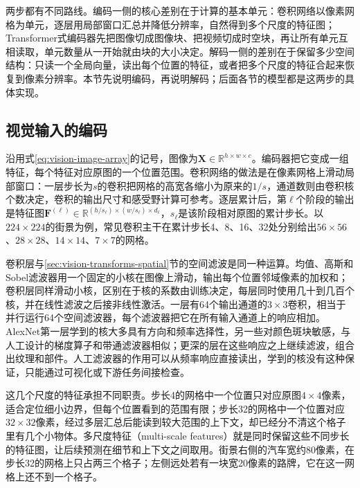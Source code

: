 两步都有不同路线。编码一侧的核心差别在于计算的基本单元：卷积网络以像素网格为单元，逐层用局部窗口汇总并降低分辨率，自然得到多个尺度的特征图；Transformer式编码器先把图像切成图像块、把视频切成时空块，再让所有单元互相读取，单元数量从一开始就由块的大小决定。解码一侧的差别在于保留多少空间结构：只读一个全局向量，读出每个位置的特征，或者把多个尺度的特征合起来恢复到像素分辨率。本节先说明编码，再说明解码；后面各节的模型都是这两步的具体实现。

\subsection{视觉输入的编码}
\label{sec:vision-ivm-encoding}

沿用式\eqref{eq:vision-image-array}的记号，图像为$\bm X\in\mathbb R^{h\times w\times c}$。编码器把它变成一组特征，每个特征对应原图的一个位置范围。卷积网络的做法是在像素网格上滑动局部窗口：一层步长为$s$的卷积把网格的高宽各缩小为原来的$1/s$，通道数则由卷积核个数决定，卷积的输出尺寸和感受野计算可参考。逐层累计后，第$\ell$个阶段的输出是特征图$\bm F^{(\ell)}\in\mathbb R^{(h/s_\ell)\times(w/s_\ell)\times d_\ell}$，$s_\ell$是该阶段相对原图的累计步长。以$224\times224$的街景为例，常见卷积主干在累计步长4、8、16、32处分别给出$56\times56$、$28\times28$、$14\times14$、$7\times7$的网格。

卷积层与\ref{sec:vision-transforms-spatial}节的空间滤波是同一种运算。均值、高斯和Sobel滤波器用一个固定的小核在图像上滑动，输出每个位置邻域像素的加权和；卷积层同样滑动小核，区别在于核的系数由训练决定，每层同时使用几十到几百个核，并在线性滤波之后接非线性激活。一层有64个输出通道的$3\times3$卷积，相当于并行运行64个空间滤波器，每个滤波器把它在所有输入通道上的响应相加。AlexNet第一层学到的核大多具有方向和频率选择性，另一些对颜色斑块敏感，与人工设计的梯度算子和带通滤波器相似；更深的层在这些响应之上继续滤波，组合出纹理和部件。人工滤波器的作用可以从频率响应直接读出，学到的核没有这种保证，只能通过可视化或下游任务间接检查。

这几个尺度的特征承担不同职责。步长4的网格中一个位置只对应原图$4\times4$像素，适合定位细小边界，但每个位置看到的范围有限；步长32的网格中一个位置对应$32\times32$像素，经过多层汇总后能读到较大范围的上下文，却已经分不清这个格子里有几个小物体。多尺度特征（multi-scale features）就是同时保留这些不同步长的特征图，让后续预测在细节和上下文之间取用。街景右侧的汽车宽约80像素，在步长32的网格上只占两三个格子；左侧远处若有一块宽20像素的路牌，它在这一网格上还不到一个格子。

